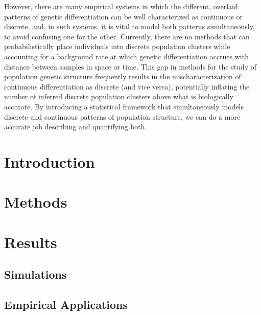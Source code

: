 \documentclass[12pt]{article}
\begin{document}
However, there are many empirical systems in which the different, overlaid patterns of genetic 
differentiation can be well characterized as continuous or discrete, and, in such systems, it is 
vital to model both patterns simultaneously, to avoid confusing one for the other.  Currently, 
there are no methods that can probabilistically place individuals into discrete population clusters 
while accounting for a background rate at which genetic differentiation accrues with distance 
between samples in space or time.  This gap in methods for the study of population genetic 
structure frequently results in the mischaracterization of continuous differentiation as discrete 
(and vice versa), potentially inflating the number of inferred discrete population clusters 
above what is biologically accurate.  By introducing a statistical framework that simultaneously 
models discrete and continuous patterns of population structure, we can do a more accurate 
job describing and quantifying both.


%


\newpage
\section*{Introduction}

\section*{Methods}

\section*{Results}

\subsection*{Simulations}

\subsection*{Empirical Applications}
\end{document}
